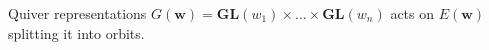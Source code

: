 \documentclass[final]{beamer}
\newlength{\onecolwid}
\newcommand{\bw}{\mathbf{w}}
\newcommand{\GL}{\mathbf{GL}}
\begin{document}
\begin{frame}[t]
\begin{columns}[t]
\begin{column}{\onecolwid}
\begin{block}{Quiver representations}
$G(\bw) = \GL(w_1) \times \ldots  \times \GL(w_n)$ acts on $E(\bw)$ splitting it into orbits.



%
\end{block}

%
%

%
%
%




\end{column}
\end{columns}
\end{frame}
\end{document}
